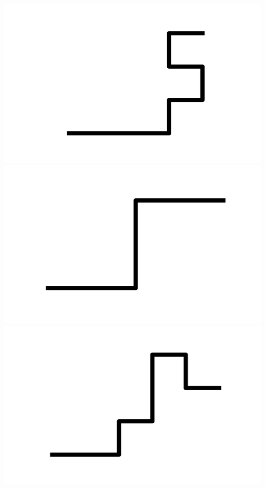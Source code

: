 \documentclass[]{report}
\begin{document}
\includegraphics[scale=.1]{pictures/21/state_cluster_shapes_346.pdf} 
\includegraphics[scale=.1]{pictures/21/state_cluster_shapes_347.pdf} 
\includegraphics[scale=.1]{pictures/21/state_cluster_shapes_348.pdf} 
\end{document}
